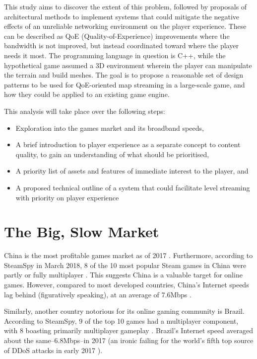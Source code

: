 \documentclass{scrartcl}
\begin{document}
This study aims to discover the extent of this problem, followed by proposals of architectural methods to implement systems that could mitigate the negative effects of an unreliable networking environment on the player experience. These can be described as QoE (Quality-of-Experience) improvements where the bandwidth is not improved, but instead coordinated toward where the player needs it most. The programming language in question is C++, while the hypothetical game assumed a 3D environment wherein the player can manipulate the terrain and build meshes. The goal is to propose a reasonable set of design patterns to be used for QoE-oriented map streaming in a large-scale game, and how they could be applied to an existing game engine.

This analysis will take place over the following steps:

\begin{itemize}
\item Exploration into the games market and its broadband speeds,
\item A brief introduction to player experience as a separate concept to content quality, to gain an understanding of what should be prioritised,
\item A priority list of assets and features of immediate interest to the player, and
\item A proposed technical outline of a system that could facilitate level streaming with priority on player experience
\end{itemize}

\section{The Big, Slow Market}
China is the most profitable games market as of 2017 \cite{chinamarket}. Furthermore, according to SteamSpy in March 2018, 8 of the 10 most popular Steam games in China were partly or fully multiplayer \cite{steamchina}. This suggests China is a valuable target for online games. However, compared to most developed countries, China's Internet speeds lag behind (figuratively speaking), at an average of 7.6Mbps \cite{webspeeds}.

Similarly, another country notorious for its online gaming community is Brazil. According to SteamSpy, 9 of the top 10 games had a multiplayer component, with 8 boasting primarily multiplayer gameplay \cite{steambrazil}. Brazil's Internet speed averaged about the same--6.8Mbps--in 2017 \cite{webspeeds} (an ironic failing for the world's fifth top source of DDoS attacks in early 2017 \cite{websecurity}).
\end{document}

